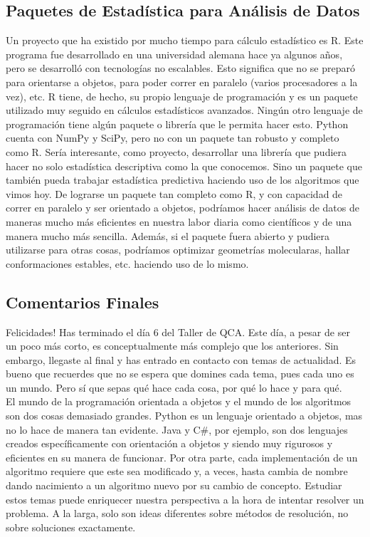 \documentclass[10pt,letterpaper]{article}
\begin{document}
\subsection{Paquetes de Estad\'istica para An\'alisis de Datos}
Un proyecto que ha existido por mucho tiempo para c\'alculo estad\'istico es R. Este programa fue desarrollado en una universidad alemana hace ya algunos a\~nos, pero se desarroll\'o con tecnolog\'ias no escalables. Esto significa que no se prepar\'o para orientarse a objetos, para poder correr en paralelo (varios procesadores a la vez), etc. R tiene, de hecho, su propio lenguaje de programaci\'on y es un paquete utilizado muy seguido en c\'alculos estad\'isticos avanzados. Ning\'un otro lenguaje de programaci\'on tiene alg\'un paquete o librer\'ia que le permita hacer esto. Python cuenta con NumPy y SciPy, pero no con un paquete tan robusto y completo como R. Ser\'ia interesante, como proyecto, desarrollar una librer\'ia que pudiera hacer no solo estad\'istica descriptiva como la que conocemos. Sino un paquete que tambi\'en pueda trabajar estad\'istica predictiva haciendo uso de los algoritmos que vimos hoy. De lograrse un paquete tan completo como R, y con capacidad de correr en paralelo y ser orientado a objetos, podr\'iamos hacer an\'alisis de datos de maneras mucho m\'as eficientes en nuestra labor diaria como cient\'ificos y de una manera mucho m\'as sencilla. Adem\'as, si el paquete fuera abierto y pudiera utilizarse para otras cosas, podr\'iamos optimizar geometr\'ias molecularas, hallar conformaciones estables, etc. haciendo uso de lo mismo.

\subsection{Comentarios Finales}
Felicidades! Has terminado el d\'ia 6 del Taller de QCA. Este d\'ia, a pesar de ser un poco m\'as corto, es conceptualmente m\'as complejo que los anteriores. Sin embargo, llegaste al final y has entrado en contacto con temas de actualidad. Es bueno que recuerdes que no se espera que domines cada tema, pues cada uno es un mundo. Pero s\'i que sepas qu\'e hace cada cosa, por qu\'e lo hace y para qu\'e.\\

El mundo de la programaci\'on orientada a objetos y el mundo de los algoritmos son dos cosas demasiado grandes. Python es un lenguaje orientado a objetos, mas no lo hace de manera tan evidente. Java y C\#, por ejemplo, son dos lenguajes creados espec\'ificamente con orientaci\'on a objetos y siendo muy rigurosos y eficientes en su manera de funcionar. Por otra parte, cada implementaci\'on de un algoritmo requiere que este sea modificado y, a veces, hasta cambia de nombre dando nacimiento a un algoritmo nuevo por su cambio de concepto. Estudiar estos temas puede enriquecer nuestra perspectiva a la hora de intentar resolver un problema. A la larga, solo son ideas diferentes sobre m\'etodos de resoluci\'on, no sobre soluciones exactamente.\\
\end{document}
